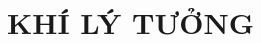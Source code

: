 \documentclass[11pt,a4paper,onecolumn,titlepage,twoside,openany]{book}
\begin{document}
\chapter{KHÍ LÝ TƯỞNG}
%	
\newpage	
\end{document}
